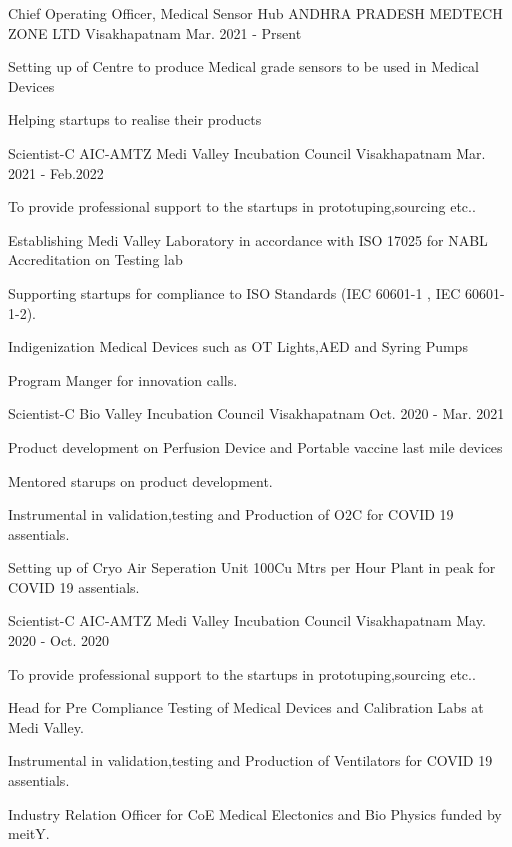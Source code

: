 \begin{cventries}
	
		\cventry
	{Chief Operating Officer, Medical Sensor Hub}
	{ANDHRA PRADESH MEDTECH ZONE LTD}
	{Visakhapatnam}
	{Mar. 2021 - Prsent}
	{
		\begin{cvitems}
			\item {Setting up of Centre to produce Medical grade sensors to be used in Medical Devices}
			\item { Helping startups to realise their products }
		\end{cvitems}
	}

	\cventry
	{Scientist-C}
	{AIC-AMTZ Medi Valley Incubation Council}
	{Visakhapatnam}
	{Mar. 2021 - Feb.2022}
	{
		\begin{cvitems}
			\item {To provide professional support to the startups in prototuping,sourcing etc..}
			\item { Establishing Medi Valley Laboratory in accordance with ISO 17025 for NABL Accreditation on Testing lab }
			\item {Supporting startups for compliance to ISO Standards (IEC 60601-1 , IEC 60601-1-2).}
			\item {Indigenization Medical Devices such as OT Lights,AED and Syring Pumps}
			\item {Program Manger for innovation calls.}
		\end{cvitems}
	}
	\cventry
	{Scientist-C}
	{Bio Valley Incubation Council}
	{Visakhapatnam}
	{Oct. 2020 - Mar. 2021}
	{
		\begin{cvitems}
			\item { Product development on Perfusion Device and Portable vaccine last mile devices}
			\item {Mentored starups on product development.}
			\item {Instrumental in validation,testing and Production of O2C for COVID 19 assentials.}
			\item {Setting up of Cryo Air Seperation Unit 100Cu Mtrs per Hour Plant in peak for COVID 19 assentials.}
		\end{cvitems}
	}

	\cventry
	{Scientist-C}
	{AIC-AMTZ Medi Valley Incubation Council}
	{Visakhapatnam}
	{May. 2020 - Oct. 2020}
	{
		\begin{cvitems}
			\item {To provide professional support to the startups in prototuping,sourcing etc..}			
			\item {Head for Pre Compliance Testing of Medical Devices and Calibration Labs at Medi Valley.}	
			\item {Instrumental in validation,testing and Production of Ventilators for COVID 19 assentials.}
			\item {Industry Relation Officer for CoE Medical Electonics and Bio Physics funded by meitY.}
		\end{cvitems}
	}



\end{cventries}
